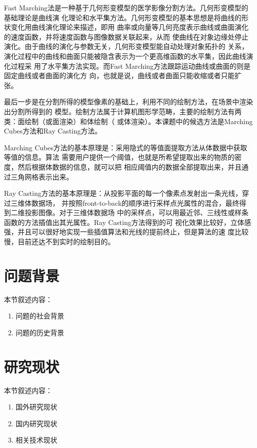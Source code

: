 Fast Marching法是一种基于几何形变模型的医学影像分割方法。几何形变模型的基础理论是曲线演
化理论和水平集方法。几何形变模型的基本思想是将曲线的形状变化用曲线演化理论来描述，即用
曲率或向量等几何亮度表示曲线或曲面演化的速度函数，并将速度函数与图像数据关联起来，从而
使曲线在对象边缘处停止演化。由于曲线的演化与参数无关，几何形变模型能自动处理对象拓扑的
关系，演化过程中的曲线和曲面只能被隐含表示为一个更高维函数的水平集，因此曲线演化过程采
用了水平集方法实现。而Fast Marching方法跟踪运动曲线或曲面的则是固定曲线或者曲面的演化方
向，也就是说，曲线或者曲面只能收缩或者只能扩张。

最后一步是在分割所得的模型像素的基础上，利用不同的绘制方法，在场景中渲染出分割所得到的
模型。绘制方法属于计算机图形学范畴，主要的绘制方法有两类：面绘制（或面渲染）和体绘制（
或体渲染）。本课题中的候选方法是Marching Cubes方法和Ray Casting方法。

Marching Cubes方法的基本原理是：采用隐式的等值面提取方法从体数据中获取等值的信息。算法
需要用户提供一个阈值，也就是所希望提取出来的物质的密度，然后根据体数据的信息，就可以把
相应阈值内的数据全部提取出来，并且通过三角网格表示出来。

Ray Casting方法的基本原理是：从投影平面的每一个像素点发射出一条光线，穿过三维体数据场，
并按照front-to-back的顺序进行采样点光属性的混合，最终得到二维投影图像。对于三维体数据场
中的采样点，可以用最近邻、三线性或样条函数的方法插值出其光属性。Ray Casting方法得到的可
视化效果比较好，立体感强，并且可以很好地实现一些插值算法和光线的提前终止，但是算法的速
度比较慢，目前还达不到实时的绘制目的。

\section{问题背景}

本节叙述内容：
\begin{enumerate}
  \item 问题的社会背景
  \item 问题的历史背景
\end{enumerate}

\section{研究现状}

本节叙述内容：
\begin{enumerate}
  \item 国外研究现状
  \item 国内研究现状
  \item 相关技术现状
\end{enumerate}

